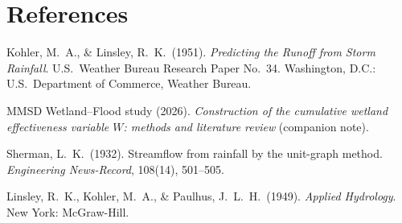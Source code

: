 \documentclass[11pt]{article}
\begin{document}
\section*{References}
\begin{enumerate}[label={[\arabic*]},leftmargin=2.2em]
  \item Kohler, M.\ A., \& Linsley, R.\ K.\ (1951). \emph{Predicting the Runoff from Storm
  Rainfall}. U.S.\ Weather Bureau Research Paper No.\ 34. Washington, D.C.: U.S.\ Department of
  Commerce, Weather Bureau.
  \item MMSD Wetland--Flood study (2026). \emph{Construction of the cumulative wetland
  effectiveness variable $W$: methods and literature review} (companion note).
  \item Sherman, L.\ K.\ (1932). Streamflow from rainfall by the unit-graph method.
  \emph{Engineering News-Record}, 108(14), 501--505.
  \item Linsley, R.\ K., Kohler, M.\ A., \& Paulhus, J.\ L.\ H.\ (1949). \emph{Applied Hydrology}.
  New York: McGraw-Hill.
\end{enumerate}
\end{document}
